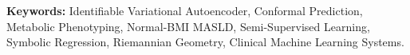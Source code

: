 \documentclass[12pt,a4paper,oneside]{report}
\begin{document}
\vspace{0.5cm}
\noindent\textbf{Keywords:} Identifiable Variational Autoencoder, Conformal Prediction, Metabolic Phenotyping, Normal-BMI MASLD, Semi-Supervised Learning, Symbolic Regression, Riemannian Geometry, Clinical Machine Learning Systems.

\clearpage
\tableofcontents

\clearpage
\listoftables
{}

\clearpage

\clearpage
\end{document}

